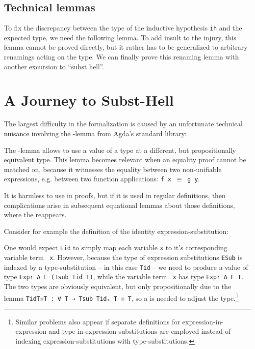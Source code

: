 \documentclass[acmsmall,anonymous,review,screen]{acmart}
\begin{document}
\subsection{Technical lemmas}
\label{sec:technical-lemmas}

\LRVrenMCGLookupType
\LRVrenMCGLookupBody

To fix the discrepancy between the type of the inductive hypothesis
\texttt{ih} and the expected type, we need the following lemma.
\LRVrenLRVwk
To add insult to the injury, this lemma cannot be proved directly, but
it rather has to be generalized to arbitrary renamings acting on the
type.
We can finally prove this renaming lemma with another excursion to
``subst hell''.
\LRVrenLRVrenEqType


\section{A Journey to Subst-Hell}
\label{sec:subst-hell}

The largest difficulty in the formalization is caused by an unfortunate
technical nuisance involving the {\Asubst}-lemma from Agda's standard library:

\SubstExamplesDef

The {\Asubst}-lemma allows to use a value of a type at a different,
but propositionally equivalent type.
This lemma becomes relevant when an equality proof cannot be matched
on, because it witnesses the equality between two non-unifiable
expressions, e.g. between two function applications: \texttt{f x $\equiv$ g y}.

It is harmless to use {\Asubst} in proofs, but if it is used in
regular definitions, then complications arise in subsequent
equational lemmas about those definitions, where the {\Asubst}
reappears.


Consider for example the definition of the identity expression-substitution:
\SubstExamplesEidDef

One would expect \texttt{Eid} to simply map each variable \texttt{x}
to it's corresponding variable term \texttt{ x}.
However, because the type of expression substitutions \texttt{ESub} is
indexed by a type-substitution -- in this case \texttt{Tid} -- we need
to produce a value of type \texttt{Expr Δ Γ (Tsub Tid T)}, while
the variable term \texttt{ x} has type \texttt{Expr Δ Γ T}.
The two types are obviously equivalent, but only propositionally due
to the lemma \texttt{TidT≡T : ∀ T → Tsub Tidₛ T ≡ T}, so a
{\Asubst} is needed to adjust the type.\footnote{
  Similar problems also appear if separate definitions for
  expression-in-expression and type-in-expression substitutions are
  employed instead of indexing expression-substitutions with type-substitutions.
}
\end{document}
